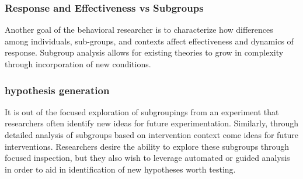 \subsubsection{Response and Effectiveness vs Subgroups}
Another goal of the behavioral researcher is to characterize how differences among individuals, sub-groups, and contexts affect effectiveness and dynamics of response.
Subgroup analysis allows for existing theories to grow in complexity through incorporation of new conditions.

\subsubsection{hypothesis generation}
It is out of the focused exploration of subgroupings from an experiment that researchers often identify new ideas for future experimentation.
Similarly, through detailed analysis of subgroups based on intervention context come ideas for future interventions.
Researchers desire the ability to explore these subgroups through focused inspection, but they also wish to leverage automated or guided analysis in order to aid in identification of new hypotheses worth testing.


